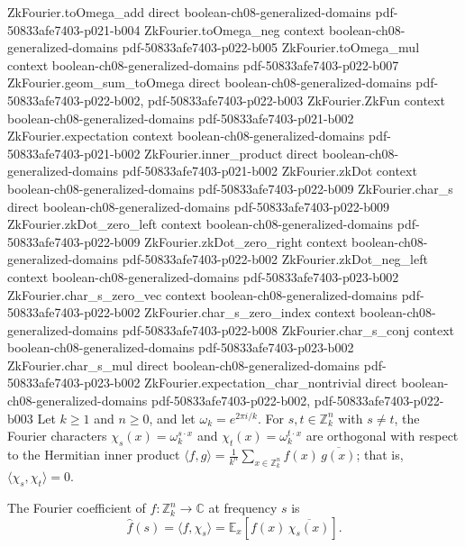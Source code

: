 \begin{lemma}
\proofstep
  {ZkFourier.toOmega_add}
  {direct}
  {boolean-ch08-generalized-domains}
  {pdf-50833afe7403-p021-b004}
\proofstep
  {ZkFourier.toOmega_neg}
  {context}
  {boolean-ch08-generalized-domains}
  {pdf-50833afe7403-p022-b005}
\proofstep
  {ZkFourier.toOmega_mul}
  {context}
  {boolean-ch08-generalized-domains}
  {pdf-50833afe7403-p022-b007}
\proofstep
  {ZkFourier.geom_sum_toOmega}
  {direct}
  {boolean-ch08-generalized-domains}
  {pdf-50833afe7403-p022-b002,
    pdf-50833afe7403-p022-b003}
\proofstep
  {ZkFourier.ZkFun}
  {context}
  {boolean-ch08-generalized-domains}
  {pdf-50833afe7403-p021-b002}
\proofstep
  {ZkFourier.expectation}
  {context}
  {boolean-ch08-generalized-domains}
  {pdf-50833afe7403-p021-b002}
\proofstep
  {ZkFourier.inner_product}
  {direct}
  {boolean-ch08-generalized-domains}
  {pdf-50833afe7403-p021-b002}
\proofstep
  {ZkFourier.zkDot}
  {context}
  {boolean-ch08-generalized-domains}
  {pdf-50833afe7403-p022-b009}
\proofstep
  {ZkFourier.char_s}
  {direct}
  {boolean-ch08-generalized-domains}
  {pdf-50833afe7403-p022-b009}
\proofstep
  {ZkFourier.zkDot_zero_left}
  {context}
  {boolean-ch08-generalized-domains}
  {pdf-50833afe7403-p022-b009}
\proofstep
  {ZkFourier.zkDot_zero_right}
  {context}
  {boolean-ch08-generalized-domains}
  {pdf-50833afe7403-p022-b002}
\proofstep
  {ZkFourier.zkDot_neg_left}
  {context}
  {boolean-ch08-generalized-domains}
  {pdf-50833afe7403-p023-b002}
\proofstep
  {ZkFourier.char_s_zero_vec}
  {context}
  {boolean-ch08-generalized-domains}
  {pdf-50833afe7403-p022-b002}
\proofstep
  {ZkFourier.char_s_zero_index}
  {context}
  {boolean-ch08-generalized-domains}
  {pdf-50833afe7403-p022-b008}
\proofstep
  {ZkFourier.char_s_conj}
  {context}
  {boolean-ch08-generalized-domains}
  {pdf-50833afe7403-p023-b002}
\proofstep
  {ZkFourier.char_s_mul}
  {direct}
  {boolean-ch08-generalized-domains}
  {pdf-50833afe7403-p023-b002}
\proofstep
  {ZkFourier.expectation_char_nontrivial}
  {direct}
  {boolean-ch08-generalized-domains}
  {pdf-50833afe7403-p022-b002,
    pdf-50833afe7403-p022-b003}
Let $k \ge 1$ and $n \ge 0$, and let $\omega_k = e^{2\pi i/k}$. For $s, t \in
\mathbb{Z}_k^n$ with $s \ne t$, the Fourier characters $\chi_s(x) = \omega_k^{s\cdot x}$
and $\chi_t(x) = \omega_k^{t\cdot x}$ are orthogonal with respect to the Hermitian inner
product $\langle f, g\rangle = \frac{1}{k^n}\sum_{x \in \mathbb{Z}_k^n}
f(x)\,\overline{g(x)}$; that is, $\langle \chi_s, \chi_t\rangle = 0$.
\end{lemma}

\begin{definition}
\label{ZkFourier.fourier_coeff}
\leanok
{}
The Fourier coefficient of $f : \mathbb{Z}_k^n \to \mathbb{C}$ at frequency
$s$ is
\[
  \hat{f}(s) = \langle f, \chi_s \rangle
             = \mathbb{E}_{x}\!\left[f(x)\,\overline{\chi_s(x)}\right].
\]
\end{definition}

